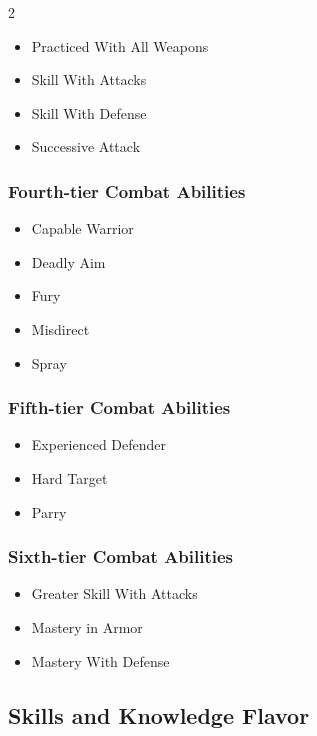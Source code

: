 \begin{multicols}{2}
\begin{itemize}

\item Practiced With All Weapons
\item Skill With Attacks
\item Skill With Defense
\item Successive Attack
\end{itemize}

\subsubsection{Fourth-tier Combat Abilities}

\begin{itemize}
\item Capable Warrior
\item Deadly Aim
\item Fury
\item Misdirect
\item Spray
\end{itemize}

\subsubsection{Fifth-tier Combat Abilities}

\begin{itemize}
\item Experienced Defender
\item Hard Target
\item Parry
\end{itemize}

\subsubsection{Sixth-tier Combat Abilities}

\begin{itemize}
\item Greater Skill With Attacks
\item Mastery in Armor
\item Mastery With Defense
\end{itemize}

\subsection{Skills and Knowledge Flavor}


\end{multicols}
